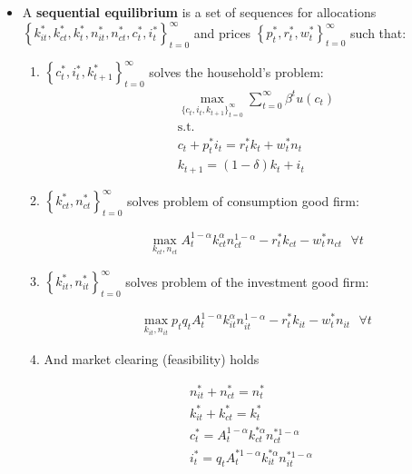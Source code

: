 \documentclass{scrartcl}
\begin{document}
\begin{itemize}
	\item A \textbf{sequential equilibrium} is a set of sequences for allocations $\left\{ k_{it}^*, k_{ct}^*, k_{t}^*, n_{it}^*, n_{ct}^*, c_{t}^*, i_{t}^* \right\}_{t=0}^{\infty}$ and prices $\left\{ p_t^*, r^*_t, w^*_t  \right\}_{t=0}^{\infty}$ such that:
	\begin{enumerate}
		\item $\left\{c_{t}^*, i_{t}^*, k_{t+1}^*  \right\}_{t=0}^{\infty}$ solves the household's problem:
		\begin{align}
		&\max_{\{{c_t, i_t, k_{t+1}}\}_{t=0}^{\infty}} {\sum_{t=0}^{\infty} \beta^t u(c_t)} \\
		&\text{s.t. } \nonumber \\
		&c_t+p_t^* i_t=r^*_t k_t+w_t^* n_t \nonumber \\
		&k_{t+1}=(1-\delta)k_t+i_t \label{eq:kacc} \nonumber
		\end{align}
		
	\item $\left\{k_{ct}^*, n_{ct}^*  \right\}_{t=0}^{\infty}$ solves problem of consumption good firm:
	
		\begin{align}
		&\max_{k_{ct}, n_{ct}} {A_t^{1-\alpha}k_{ct}^\alpha n_{ct}^{1-\alpha}-r_t^* k_{ct}-w_{t}^* n_{ct}} \text{ }\forall t
		\end{align}
		
	\item $\left\{k_{it}^*, n_{it}^*  \right\}_{t=0}^{\infty}$ solves problem of the investment good firm:
	
		\begin{align}
		&\max_{k_{it}, n_{it}} {p_t q_t A_t^{1-\alpha}k_{it}^\alpha n_{it}^{1-\alpha}-r_t^* k_{it}-w_{t}^* n_{it}} \text{ }\forall t
		\end{align}
		
		\item And market clearing (feasibility) holds
		
		\begin{align}
		n^*_{it}+n^*_{ct}=n^*_{t} \label{eq:nclearing} \\
		k^*_{it}+k^*_{ct}=k^*_{t} \label{eq:kclearing} \\
		c^*_{t}=A_t^{1-\alpha}k^{* \alpha}_{ct} n_{ct}^{* 1-\alpha} \\
		i^*_t=q_t A_t^{*1-\alpha}k_{it}^{*\alpha} n_{it}^{* 1-\alpha}
		\end{align}
		
	\end{enumerate}
	
\end{itemize}
\end{document}
